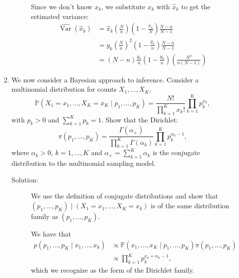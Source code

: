 \documentclass[letterpaper,11pt]{article}
\begin{document}
\begin{enumerate}
\begin{enumerate}
\begin{description}
        Since we don't know $x_k$, we substitute $x_k$ with $\hat{x}_k$ to get
        the estimated variance:
        \begin{align}
          \hat{\operatorname{Var}}\left(\hat{x}_k\right)
          &= \hat{x}_k\left(\frac{N}{n}\right)
            \left(1 - \frac{\hat{x}_k}{N}\right)\frac{N-n}{N-1} \nonumber\\
          &= y_k\left(\frac{N}{n}\right)^2
            \left(1 - \frac{y_k}{n}\right)\frac{N-n}{N-1} \nonumber\\
          &= \left(N - n\right)\frac{y_k}{n}\left(1 - \frac{y_k}{n}\right)
            \left(\frac{N^2}{n\left(N-1\right)}\right)
            \label{eqn:p3_xk_method_of_moments_variance_factored}
        \end{align}
      \end{description}
    \item We now consider a Bayesian approach to inference. Consider a
      multinomial distribution for counts $X_1,\ldots,X_K$,
      \begin{equation}
        \mathbb{P}\left(
          X_1 = x_1,\ldots,X_K = x_K \mid p_1,\ldots,p_K
        \right)
        = \frac{N!}{\prod_{k=1}^Kx_k!}\prod_{k=1}^K p_k^{x_k},
        \label{eqn:p3_multionomial}
      \end{equation}
      with $p_k > 0$ and $\sum_{k=1}^Kp_k = 1$. Show that the Dirichlet:
      \begin{equation}
        \pi\left(p_1,\ldots,p_K\right) = \frac{\Gamma\left(
            \alpha_+
          \right)}{\prod_{k=1}^K\Gamma\left(\alpha_k\right)}
        \prod_{k=1}^Kp_k^{\alpha_k-1},
        \label{eqn:p3_dirichlet}
      \end{equation}
      where $\alpha_k > 0$, $k = 1,\ldots,K$ and
      $\alpha_+ = \sum_{k=1}^K\alpha_k$ is the conjugate distribution to the
      multinomial sampling model.

      \begin{description}
      \item[Solution:] We use the definition of conjugate distributions and show
        that
        $\left(p_1,\ldots,p_K\right) \mid \left(X_1 = x_1,\ldots,X_K =
          x_k\right)$ is of the same distribution family as
        $\left(p_1,\ldots,p_K\right)$.

        We have that
        \begin{align}
          p\left(p_1,\ldots,p_K \mid x_1,\ldots,x_k\right)
          &\propto \mathbb{P}\left(
            x_1,\ldots,x_K \mid p_1,\ldots,p_K
            \right)\pi\left(p_1,\ldots,p_K\right) \nonumber\\
          &\propto \prod_{k=1}^K p_k^{x_k + \alpha_k - 1},
            \label{eqn:p3_posterior_propto}
        \end{align}
        which we recognize as the form of the Dirichlet family.


\end{description}
\end{enumerate}
\end{enumerate}
\end{document}
